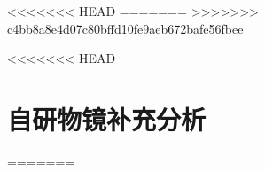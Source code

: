\thispagestyle{appendixheader}
\setcounter{app_fig}{1}
\setcounter{app_tab}{1}
\setcounter{equation}{0}
\renewcommand\theequation{附\arabic{app}-\arabic{equation}}
<<<<<<< HEAD
\renewcommand\chaptername{附录}
\renewcommand\chaptername{Appendix}
\renewcommand\thechapter{附录\zhnum{app}}
=======
\renewcommand\chaptername{附录}
\renewcommand\chaptername{Appendix} 
\renewcommand\thechapter{附录\zhnum{app}} 
>>>>>>> c4bb8a8e4d07c80bffd10fe9aeb672bafe56fbee

\setcounter{chapter}{0}
\setcounter{section}{0}

<<<<<<< HEAD
\chapter{自研物镜补充分析}\label{chap:app1}
=======

